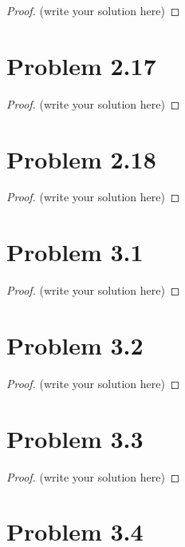 \documentclass[12pt]{article}
\begin{document}
\begin{proof}
	(write your solution here)
\end{proof}

\newpage 

\section{Problem 2.17}

\begin{proof}
	(write your solution here)
\end{proof}

\newpage 

\section{Problem 2.18}

\begin{proof}
	(write your solution here)
\end{proof}

\newpage 

\section{Problem 3.1}

\begin{proof}
	(write your solution here)
\end{proof}

\newpage 

\section{Problem 3.2}

\begin{proof}
	(write your solution here)
\end{proof}

\newpage 

\section{Problem 3.3}

\begin{proof}
	(write your solution here)
\end{proof}

\newpage 

\section{Problem 3.4}
\end{document}
